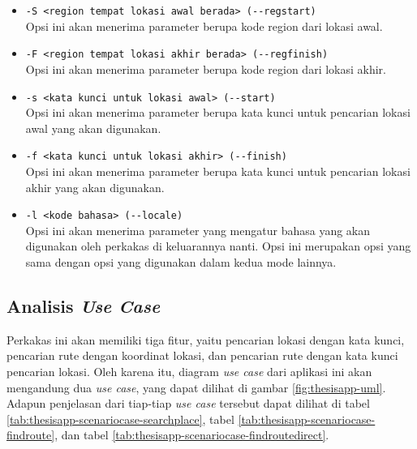 \begin{itemize}
\begin{itemize}
		\begin{itemize}
			\item \verb|-S <region tempat lokasi awal berada> (--regstart)|\\
			Opsi ini akan menerima parameter berupa kode region dari lokasi awal.
			\item \verb|-F <region tempat lokasi akhir berada> (--regfinish)|\\
			Opsi ini akan menerima parameter berupa kode region dari lokasi akhir.
			\item \verb|-s <kata kunci untuk lokasi awal> (--start)|\\
			Opsi ini akan menerima parameter berupa kata kunci untuk pencarian lokasi awal yang akan digunakan.
			\item \verb|-f <kata kunci untuk lokasi akhir> (--finish)|\\
			Opsi ini akan menerima parameter berupa kata kunci untuk pencarian lokasi akhir yang akan digunakan.
			\item \verb|-l <kode bahasa> (--locale)|\\
			Opsi ini akan menerima parameter yang mengatur bahasa yang akan digunakan oleh perkakas di keluarannya nanti. Opsi ini merupakan opsi yang sama dengan opsi yang digunakan dalam kedua mode lainnya.
		\end{itemize}
		
	\end{itemize}
	
\end{itemize}

\subsection{Analisis \textit{Use Case}}
\label{sec:analysis-thesisapp-usecases}

Perkakas \cl ini akan memiliki tiga fitur, yaitu pencarian lokasi dengan kata kunci, pencarian rute dengan koordinat \latlon lokasi, dan pencarian rute dengan kata kunci pencarian lokasi. Oleh karena itu, diagram \textit{use case} dari aplikasi ini akan mengandung dua \textit{use case}, yang dapat dilihat di gambar \ref{fig:thesisapp-uml}. Adapun penjelasan dari tiap-tiap \textit{use case} tersebut dapat dilihat di tabel \ref{tab:thesisapp-scenariocase-searchplace}, tabel \ref{tab:thesisapp-scenariocase-findroute}, dan tabel \ref{tab:thesisapp-scenariocase-findroutedirect}.

